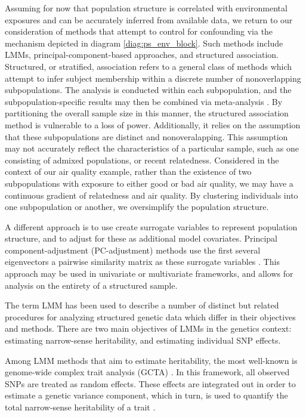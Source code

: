 Assuming for now that population structure is correlated with environmental exposures and can be accurately inferred from available data, we return to our consideration of methods that attempt to control for confounding via the mechanism depicted in diagram \eqref{diag:ps_env_block}. Such methods include LMMs, principal-component-based approaches, and structured association. Structured, or stratified, association refers to a general class of methods which attempt to infer subject membership within a discrete number of nonoverlapping subpopulations. The analysis is conducted within each subpopulation, and the subpopulation-specific results may then be combined via meta-analysis \citep{pritchard1999use, pritchard2000association}. By partitioning the overall sample size in this manner, the structured association method is vulnerable to a loss of power. Additionally, it relies on the assumption that these subpopulations are distinct and nonoveralapping. This assumption may not accurately reflect the characteristics of a particular sample, such as one consisting of admixed populations, or recent relatedness. Considered in the context of our air quality example, rather than the existence of two subpopulations with exposure to either good or bad air quality, we may have a continuous gradient of relatedness and air quality. By clustering individuals into one subpopulation or another, we oversimplify the population structure.

A different approach is to use create surrogate variables to represent population structure, and to adjust for these as additional model covariates. Principal component-adjustment (PC-adjustment) methods use the first several eigenvectors a pairwise similarity matrix as these surrogate variables \citep{price2006principal}. This approach may be used in univariate or multivariate frameworks, and allows for analysis on the entirety of a structured sample. 

The term LMM has been used to describe a number of distinct but related procedures for analyzing structured genetic data which differ in their objectives and methods. There are two main objectives of LMMs in the genetics context: estimating narrow-sense heritability, and estimating individual SNP effects.

Among LMM methods that aim to estimate heritability, the most well-known is genome-wide complex trait analysis (GCTA) \citep{yang2011gcta}. In this framework, all observed SNPs are treated as random effects. These effects are integrated out in order to estimate a genetic variance component, which in turn, is used to quantify the total narrow-sense heritability of a trait \citep{yang2010common}.

